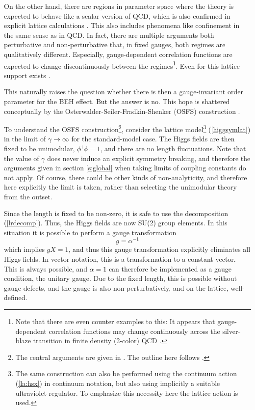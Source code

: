 \documentclass[final,12pt]{article}
\newcommand*{\no}{\noindent}
\newcommand*{\be}{\begin{equation}}
\newcommand*{\ee}{\end{equation}}
\newcommand*{\pref}[1]{(\ref{#1})}
\newcommand*{\nn}{\nonumber}
\newcommand*{\1}{1\!\!\!\bot}
\begin{document}
On the other hand, there are regions in parameter space where the theory is expected to behave like a scalar version of QCD, which is also confirmed in explicit lattice calculations \cite{Knechtli:1998gf,Knechtli:1999qe,Maas:2010nc,Maas:2013aia,Maas:2014pba}. This also includes phenomena like confinement in the same sense as in QCD. In fact, there are multiple arguments both perturbative \cite{Bohm:2001yx,Kapusta:2006pm,Damgaard:1985nb} and non-perturbative \cite{Kugo:1979gm,Schaden:2013ffa,Alkofer:2000wg,Fischler:1974ue,Nielsen:1975fs,Greensite:2017ajx,Bricmont:1985sw,Bricmont:1985by,Bricmont:1987zh} that, in fixed gauges, both regimes are qualitatively different. Especially, gauge-dependent correlation functions are expected to change discontinuously between the regimes\footnote{Note that there are even counter examples to this: It appears that gauge-dependent correlation functions may change continuously across the silver-blaze transition in finite density (2-color) QCD \cite{Boz:2018crd}.}. Even for this lattice support exists \cite{Maas:2013aia}.

This naturally raises the question whether there is then a gauge-invariant order parameter for the BEH effect. But the answer is no. This hope is shattered conceptually by the Osterwalder-Seiler-Fradkin-Shenker (OSFS) construction \cite{Osterwalder:1977pc,Fradkin:1978dv,Seiler:2015rwa,Seiler:1982pw,Glimm:1987ng}.

To understand the OSFS construction\footnote{The central arguments are given in \cite{Osterwalder:1977pc}. The outline here follows \cite{Fradkin:1978dv}.}, consider the lattice model\footnote{The same construction can also be performed using the continuum action \pref{la:hsx} in continuum notation, but also using implicitly a suitable ultraviolet regulator. To emphasize this necessity here the lattice action is used.} \pref{higgsymlat} in the limit of $\gamma\to\infty$ for the standard-model case. The Higgs fields are then fixed to be unimodular, $\phi^\dagger\phi=1$, and there are no length fluctuations. Note that the value of $\gamma$ does never induce an explicit symmetry breaking, and therefore the arguments given in section \ref{s:global} when taking limits of coupling constants do not apply. Of course, there could be other kinds of non-analyticity, and therefore here explicitly the limit is taken, rather than selecting the unimodular theory from the outset.

Since the length is fixed to be non-zero, it is safe to use the decomposition \pref{lrdecomp}. Thus, the Higgs fields are now SU(2) group elements. In this situation it is possible to perform a gauge transformation
\be
g=\alpha^{-1}\nn
\ee
\no which implies $gX=1$, and thus this gauge transformation explicitly eliminates all Higgs fields. In vector notation, this is a transformation to a constant vector. This is always possible, and $\alpha=1$ can therefore be implemented as a gauge condition, the unitary gauge. Due to the fixed length, this is possible without gauge defects, and the gauge is also non-perturbatively, and on the lattice, well-defined.
\end{document}
